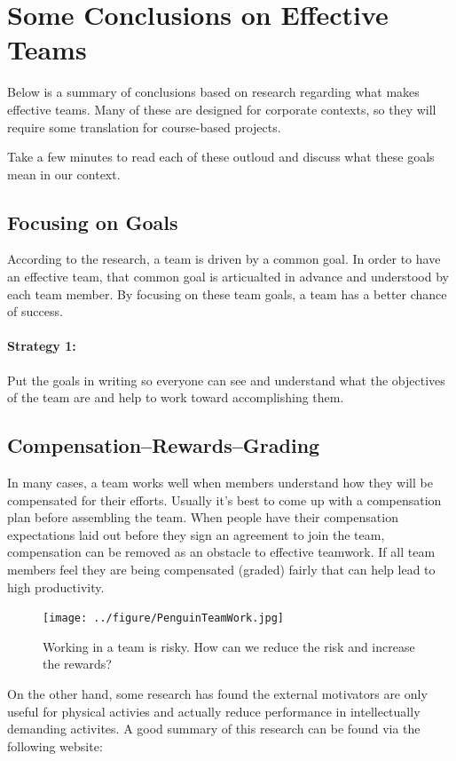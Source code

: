 \documentclass{article}\usepackage[]{graphicx}\usepackage[]{color}
\begin{document}
\section{Some Conclusions on Effective Teams}

Below is a summary of conclusions based on research regarding what makes effective teams. Many of these are designed for corporate contexts, so they will require some translation for course-based projects.

Take a few minutes to read each of these outloud and discuss what these goals mean in our context.

\subsection{Focusing on Goals}

According to the research, a team is driven by a common goal. In order to have an effective team, that common goal is articualted in advance and understood by each team member. By focusing on these team goals, a team has a better chance of success. 

\paragraph{Strategy 1:} Put the goals in writing so everyone can see and understand what the objectives of the team are and help to work toward accomplishing them.

\subsection{Compensation--Rewards--Grading}

In many cases, a team works well when members understand how they will be compensated for their efforts. Usually it's best to come up with a compensation plan before assembling the team. When people have their compensation expectations laid out before they sign an agreement to join the team, compensation can be removed as an obstacle to effective teamwork. If all team members feel they are being compensated (graded) fairly that can help lead to high productivity.

\begin{figure}
\texttt{[image: ../figure/PenguinTeamWork.jpg]}
\caption{Working in a team is risky. How can we reduce the risk and increase the rewards?}
\end{figure}

On the other hand, some research has found the external motivators are only useful for physical activies and actually reduce performance in intellectually demanding activites. A good summary of this research can be found via the following website:
\end{document}
